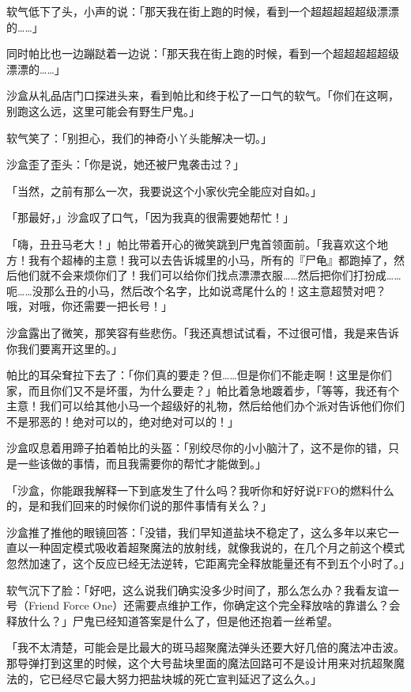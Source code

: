 软气低下了头，小声的说：「那天我在街上跑的时候，看到一个超超超超超级漂漂的……」

同时帕比也一边蹦跶着一边说：「那天我在街上跑的时候，看到一个超超超超超级漂漂的……」

\horizonline


沙盒从礼品店门口探进头来，看到帕比和终于松了一口气的软气。「你们在这啊，别跑这么远，这里可能会有野生尸鬼。」

软气笑了：「别担心，我们的神奇小丫头能解决一切。」

沙盒歪了歪头：「你是说，她还被尸鬼袭击过？」

「当然，之前有那么一次，我要说这个小家伙完全能应对自如。」

「那最好，」沙盒叹了口气，「因为我真的很需要她帮忙！」

「嗨，丑丑马老大！」帕比带着开心的微笑跳到尸鬼首领面前。「我喜欢这个地方！我有个超棒的主意！我可以去告诉城里的小马，所有的『尸龟』都跑掉了，然后他们就不会来烦你们了！我们可以给你们找点漂漂衣服……然后把你们打扮成……呃……没那么丑的小马，然后改个名字，比如说鸢尾什么的！这主意超赞对吧？哦，对哦，你还需要一把长号！」

沙盒露出了微笑，那笑容有些悲伤。「我还真想试试看，不过很可惜，我是来告诉你我们要离开这里的。」

帕比的耳朵耷拉下去了：「你们真的要走？但……但是你们不能走啊！这里是你们家，而且你们又不是坏蛋，为什么要走？」帕比着急地踱着步，「等等，我还有个主意！我们可以给其他小马一个超级好的礼物，然后给他们办个派对告诉他们你们不是邪恶的！绝对可以的，绝对绝对可以的！」

沙盒叹息着用蹄子拍着帕比的头盔：「别绞尽你的小小脑汁了，这不是你的错，只是一些该做的事情，而且我需要你的帮忙才能做到。」

「沙盒，你能跟我解释一下到底发生了什么吗？我听你和好好说FFO的燃料什么的，是和我们回来的时候你们说的那件事情有关么？」

沙盒推了推他的眼镜回答：「没错，我们早知道盐块不稳定了，这么多年以来它一直以一种固定模式吸收着超聚魔法的放射线，就像我说的，在几个月之前这个模式忽然加速了，这个反应已经无法逆转，它距离完全释放能量还有不到五个小时了。」

软气沉下了脸：「好吧，这么说我们确实没多少时间了，那么怎么办？我看友谊一号（Friend Force One）还需要点维护工作，你确定这个完全释放啥的靠谱么？会释放什么？」尸鬼已经知道答案是什么了，但是他还抱着一丝希望。

「我不太清楚，可能会是比最大的斑马超聚魔法弹头还要大好几倍的魔法冲击波。那导弹打到这里的时候，这个大号盐块里面的魔法回路可不是设计用来对抗超聚魔法的，它已经尽它最大努力把盐块城的死亡宣判延迟了这么久。」

